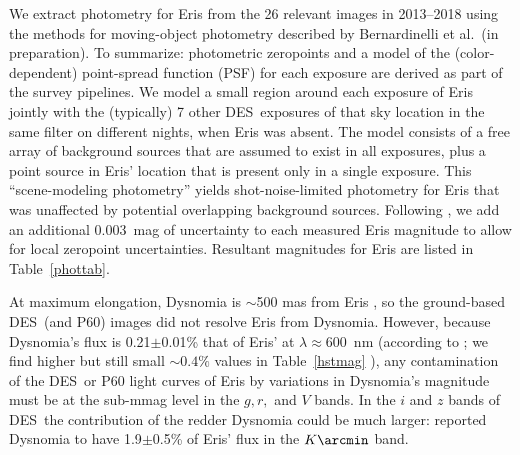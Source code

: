 \documentclass[onecolumn]{aastex631}
\newcommand{\des}{DES}
\begin{document}
We extract photometry for Eris from the 26 relevant images in 2013--2018 using the methods for moving-object photometry described by Bernardinelli et al.\ (in preparation).
To summarize: photometric zeropoints and a model of the (color-dependent) point-spread function (PSF) for each exposure are derived as part of the survey pipelines. We model a small region around each exposure of Eris jointly with the (typically) 7 other \des\ exposures of that sky location in the same filter on different nights, when Eris was absent. The model consists of a free array of background sources that are assumed to exist in all exposures, plus a point source in Eris' location that is present only in a single exposure.  This ``scene-modeling photometry'' yields shot-noise-limited photometry for Eris that was unaffected by potential overlapping background sources. Following  \citet{desdr2}, we add an additional 0.003~mag of uncertainty to each measured Eris magnitude to allow for local zeropoint uncertainties. Resultant magnitudes for Eris are listed in Table~\ref{phottab}.

At maximum elongation, Dysnomia is $\sim$500 mas from Eris \citep{BS2007,BB2018,H21}, so the ground-based \des\ (and P60) images did not resolve Eris from Dysnomia. However, because Dysnomia's flux is 0.21$\pm$0.01\% that of Eris' at $\lambda\approx600$~nm (according to \citealt{BS2007}; we find higher but still small $\sim0.4\%$ values in Table~\ref{hstmag} ), any contamination of the \des\ or P60 light curves of Eris by variations in Dysnomia's magnitude must be at the sub-mmag level in the $g, r,$ and $V$ bands. In the $i$ and $z$ bands of \des\ the contribution of the redder Dysnomia could be much larger: \citet{Br06} reported Dysnomia to have 1.9$\pm$0.5\% of Eris' flux in the $K\arcmin$ band.
\end{document}
